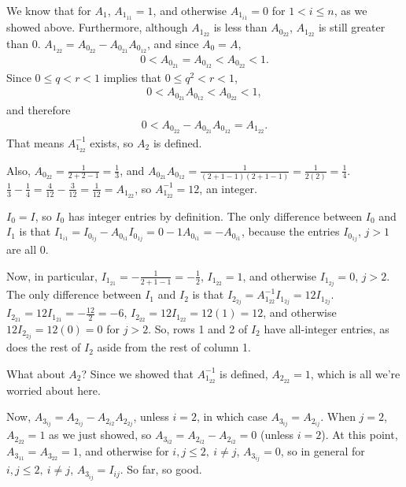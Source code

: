 \documentclass[12pt]{article}
\begin{document}
\begin{enumerate}
    We know that for $A_1$, $A_{1_{11}} = 1$, and
    otherwise $A_{1_{i1}} = 0$ for $1 < i \leq n$, as we showed
    above. Furthermore, although $A_{1_{22}}$ is less than
    $A_{0_{22}}$, $A_{1_{22}}$ is still greater than $0$.
    $A_{1_{22}} = A_{0_{22}} - A_{0_{21}}A_{0_{12}}$, and since
    $A_{0} = A$,
    \begin{align*}
       0 < A_{0_{21}} = A_{0_{12}} < A_{0_{22}} < 1.
    \end{align*}
    Since $0 \leq q < r < 1$ implies that $0 \leq q^{2} < r < 1$,
    \begin{align*}
      0 < A_{0_{21}}A_{0_{12}} < A_{0_{22}} < 1,
    \end{align*}
    and therefore
    \begin{align*}
      0 < A_{0_{22}} - A_{0_{21}}A_{0_{12}} = A_{1_{22}}.
    \end{align*}
    That means $A_{1_{22}}^{-1}$ exists, so $A_{2}$ is defined.

    Also, $A_{0_{22}} = \frac{1}{2 + 2 - 1} = \frac{1}{3}$, and
    $A_{0_{21}}A_{0_{12}} = \frac{1}{(2 + 1 - 1)(2 + 1 - 1)} =
    \frac{1}{2(2)} = \frac{1}{4}$. $\frac{1}{3} - \frac{1}{4} =
    \frac{4}{12} - \frac{3}{12} = \frac{1}{12} = A_{1_{22}}$, so
    $A_{1_{22}}^{-1} = 12$, an integer.

    $I_0 = I$, so $I_0$ has integer entries by definition. The
    only difference between $I_0$ and $I_1$ is that $I_{1_{i1}} =
    I_{0_{ij}} - A_{0_{i1}}I_{0_{1j}} = 0 - 1A_{0_{i1}} =
    -A_{0_{i1}}$, because the entries $I_{0_{1j}}$, $j > 1$ are
    all 0.

    Now, in particular, $I_{1_{21}} = -\frac{1}{2 + 1 - 1} =
    -\frac{1}{2}$, $I_{1_{22}} = 1$, and otherwise $I_{1_{2j}} =
    0$, $j > 2$. The only difference between $I_1$ and $I_2$ is
    that $I_{2_{2j}} = A_{1_{22}}^{-1}I_{1_{2j}} = 12I_{1_{2j}}$.
    $I_{2_{21}} = 12I_{1_{21}} = -\frac{12}{2} = -6$, $I_{2_{22}}
    = 12I_{1_{22}} = 12(1) = 12$, and otherwise $12I_{2_{2j}} =
    12(0) = 0$ for $j > 2$. So, rows 1 and 2 of $I_2$ have
    all-integer entries, as does the rest of $I_2$ aside from the
    rest of column 1.

    What about $A_2$? Since we showed that $A_{1_{22}}^{-1}$ is
    defined, $A_{2_{22}} = 1$, which is all we're worried about
    here.

    Now, $A_{3_{ij}} = A_{2_{ij}} - A_{2_{i2}}A_{2_{2j}}$, unless
    $i = 2$, in which case $A_{3_{ij}} = A_{2_{ij}}$. When $j =
    2$, $A_{2_{22}} = 1$ as we just showed, so $A_{3_{i2}} =
    A_{2_{i2}} - A_{2_{i2}} = 0$ (unless $i = 2$). At this point,
    $A_{3_{11}} = A_{3_{22}} = 1$, and otherwise for $i,j \leq
    2,\ i \neq j$, $A_{3_{ij}} = 0$, so in general for $i,j \leq
    2,\ i \neq j$, $A_{3_{ij}} = I_{ij}$. So far, so good.


\end{enumerate}
\end{document}
